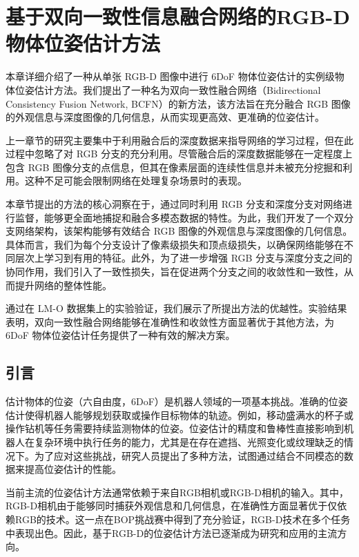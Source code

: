\chapter{基于双向一致性信息融合网络的RGB-D物体位姿估计方法}

本章详细介绍了一种从单张 RGB-D 图像中进行 6DoF 物体位姿估计的实例级物体位姿估计方法。我们提出了一种名为双向一致性融合网络（Bidirectional Consistency Fusion Network, BCFN）的新方法，该方法旨在充分融合 RGB 图像的外观信息与深度图像的几何信息，从而实现更高效、更准确的位姿估计。

上一章节的研究主要集中于利用融合后的深度数据来指导网络的学习过程，但在此过程中忽略了对 RGB 分支的充分利用。尽管融合后的深度数据能够在一定程度上包含 RGB 图像分支的点信息，但其在像素层面的连续性信息并未被充分挖掘和利用。这种不足可能会限制网络在处理复杂场景时的表现。

本章节提出的方法的核心洞察在于，通过同时利用 RGB 分支和深度分支对网络进行监督，能够更全面地捕捉和融合多模态数据的特性。为此，我们开发了一个双分支网络架构，该架构能够有效结合 RGB 图像的外观信息与深度图像的几何信息。具体而言，我们为每个分支设计了像素级损失和顶点级损失，以确保网络能够在不同层次上学习到有用的特征。此外，为了进一步增强 RGB 分支与深度分支之间的协同作用，我们引入了一致性损失，旨在促进两个分支之间的收敛性和一致性，从而提升网络的整体性能。

通过在 LM-O 数据集上的实验验证，我们展示了所提出方法的优越性。实验结果表明，双向一致性融合网络能够在准确性和收敛性方面显著优于其他方法，为 6DoF 物体位姿估计任务提供了一种有效的解决方案。

\section{引言}

估计物体的位姿（六自由度，6DoF）是机器人领域的一项基本挑战。准确的位姿估计使得机器人能够规划获取或操作目标物体的轨迹。例如，移动盛满水的杯子或操作钻机等任务需要持续监测物体的位姿。位姿估计的精度和鲁棒性直接影响到机器人在复杂环境中执行任务的能力，尤其是在存在遮挡、光照变化或纹理缺乏的情况下。为了应对这些挑战，研究人员提出了多种方法，试图通过结合不同模态的数据来提高位姿估计的性能。

当前主流的位姿估计方法通常依赖于来自RGB相机\cite{su2022zebrapose}或RGB-D相机\cite{2024hipose}的输入。其中，RGB-D相机由于能够同时捕获外观信息和几何信息，在准确性方面显著优于仅依赖RGB的技术。这一点在BOP挑战赛\cite{hodan2024bop}中得到了充分验证，RGB-D技术在多个任务中表现出色。因此，基于RGB-D的位姿估计方法已逐渐成为研究和应用的主流方向。

